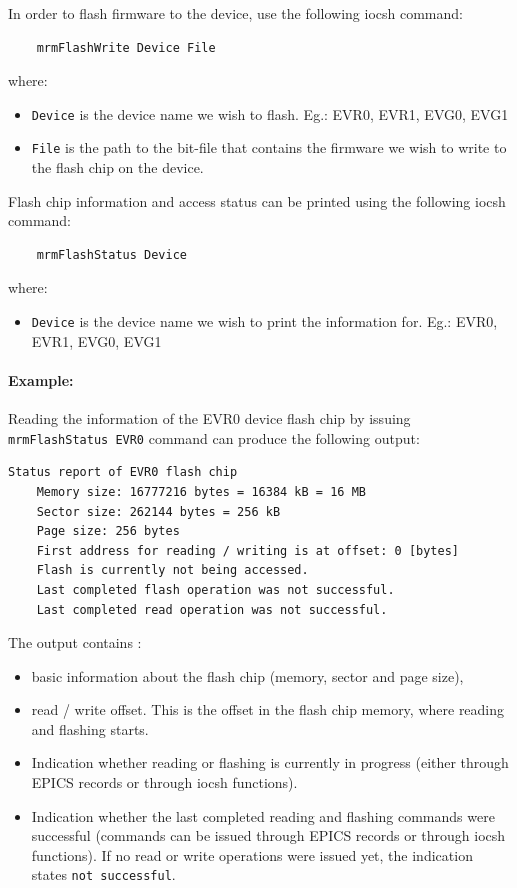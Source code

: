 \documentclass[12pt,a4paper]{article}
\begin{document}
In order to flash firmware to the device, use the following iocsh command:
\begin{verbatim}
	mrmFlashWrite Device File
\end{verbatim}
where:
\begin{itemize}
	\item \texttt{Device} is the device name we wish to flash. Eg.: EVR0, EVR1, EVG0, EVG1
	\item \texttt{File} is the path to the bit-file that contains the firmware we wish to write to the flash chip on the device.
\end{itemize}

Flash chip information and access status can be printed using the following iocsh command:
\begin{verbatim}
	mrmFlashStatus Device
\end{verbatim}
where:
\begin{itemize}
	\item \texttt{Device} is the device name we wish to print the information for. Eg.: EVR0, EVR1, EVG0, EVG1
\end{itemize}

\paragraph{Example:} Reading the information of the EVR0 device flash chip by issuing \texttt{mrmFlashStatus EVR0} command can produce the following output:
\begin{verbatim}
Status report of EVR0 flash chip
    Memory size: 16777216 bytes = 16384 kB = 16 MB
    Sector size: 262144 bytes = 256 kB
    Page size: 256 bytes
    First address for reading / writing is at offset: 0 [bytes]
    Flash is currently not being accessed.
    Last completed flash operation was not successful.
    Last completed read operation was not successful.
\end{verbatim}
The output contains :
\begin{itemize}
	\item basic information about the flash chip (memory, sector and page size),
	\item read / write offset. This is the offset in the flash chip memory, where reading and flashing starts.
	\item Indication whether reading or flashing is currently in progress (either through EPICS records or through iocsh functions).
	\item Indication whether the last completed reading and flashing commands were successful (commands can be issued through EPICS records or through iocsh functions). If no read or write operations were issued yet, the indication states \texttt{not successful}.
\end{itemize}
\end{document}
